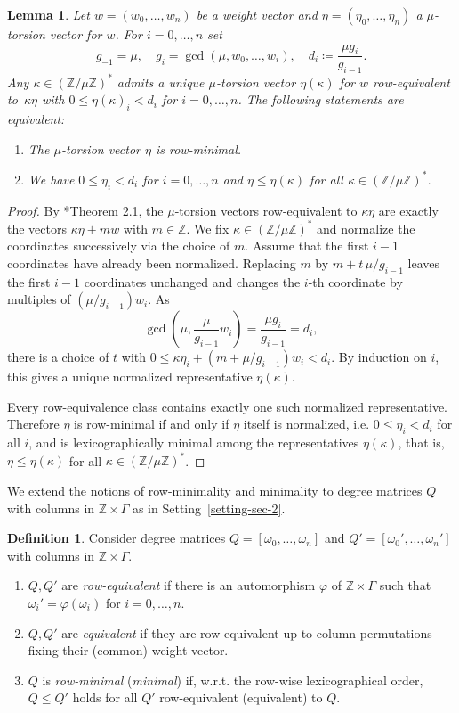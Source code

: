 \documentclass{amsart}
\newcommand{\Z}{\mathbb{Z}}
\theoremstyle{plain}
\newtheorem{lemma}[theorem]{Lemma}
\theoremstyle{definition}
\newtheorem{definition}[theorem]{Definition}
\begin{document}
\begin{lemma}\label{lem:lex_min}
Let $w=(w_0,\dots,w_n)$ be a weight vector and
$\eta=(\eta_0,\dots,\eta_n)$ a $\mu$-torsion vector for $w$.
For $i = 0, \ldots, n$ set
$$
g_{-1}=\mu,\quad g_i=\gcd(\mu,w_0,\dots,w_i),\quad d_i\coloneqq\dfrac{\mu g_i}{g_{i-1}}.
$$
Any $\kappa \in(\Z/\mu\Z)^*$ admits a unique $\mu$-torsion
vector $\eta(\kappa)$ for $w$ row-equivalent to~$\kappa \eta$ with
$0 \le \eta(\kappa)_i < d_i$ for $i=0,\dots,n$.
The following statements are equivalent:
\begin{enumerate}
\item
The $\mu$-torsion vector $\eta$ is row-minimal.
\item
We have $0\leq\eta_i<d_i$ for $i=0,\dots,n$ and $\eta\leq \eta(\kappa)$ for all  $\kappa\in(\Z/\mu\Z)^*$.
\end{enumerate}
\end{lemma}

\begin{proof}
By \cite{Ghi}*{Theorem 2.1}, the $\mu$-torsion vectors row-equivalent to
$\kappa\eta$ are exactly the vectors $\kappa\eta+mw$ with $m\in\Z$.
We fix $\kappa\in(\Z/\mu\Z)^*$ and normalize the coordinates successively via the choice of $m$.
Assume that the first $i-1$ coordinates have already been normalized. Replacing $m$ by
$m+t\,\mu/g_{i-1}$ leaves the first $i-1$ coordinates unchanged and changes the $i$-th coordinate by
multiples of $(\mu/g_{i-1})w_i$. As
\[
\gcd\!\left(\mu,\frac{\mu}{g_{i-1}}w_i\right)=\frac{\mu g_i}{g_{i-1}}=d_i,
\]
there is a choice of $t$ with $0\le \kappa\eta_i+(m+\mu/g_{i-1})w_i<d_i$. By induction on $i$, this gives a unique
normalized representative $\eta(\kappa)$.

Every row-equivalence class contains exactly one such normalized
representative. Therefore $\eta$ is row-minimal if and only if
$\eta$ itself is normalized, i.e. $0\le \eta_i<d_i$ for all $i$,
and is lexicographically minimal among the representatives
$\eta(\kappa)$, that is, $\eta\le \eta(\kappa)$ for all
$\kappa\in(\Z/\mu\Z)^*$.
\end{proof}

We extend the notions of row-minimality and minimality to degree
matrices $Q$ with columns in $\Z \times \Gamma$ as in
Setting~\ref{setting-sec-2}.

\begin{definition}
Consider degree matrices $Q = [\omega_0,\ldots, \omega_n]$
and $Q' = [\omega_0',\ldots, \omega_n']$ with columns in $\Z \times \Gamma$.
\begin{enumerate}
\item
$Q, Q'$ are \emph{row-equivalent} if there is an automorphism
$\varphi$ of $\Z \times \Gamma$ such that $\omega_i' = \varphi(\omega_i)$
for $i = 0, \ldots, n$.
\item
$Q, Q'$ are \emph{equivalent} if they are row-equivalent up to column permutations fixing their (common) weight vector.
\item
$Q$ is \emph{row-minimal} (\emph{minimal}) if, w.r.t. the row-wise
lexicographical order, $Q\leq Q'$ holds for all $Q'$ row-equivalent
(equivalent) to $Q$.
\end{enumerate}
\end{definition}
\end{document}

